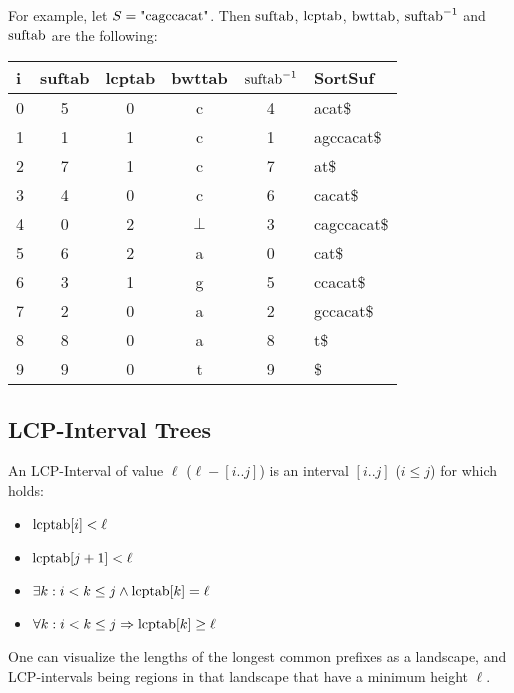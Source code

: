 \documentclass[a4paper,10pt]{article}
\begin{document}
For example, let $S=\hbox{"cagccacat"}$. Then $\hbox{suftab}$,
$\hbox{lcptab}$, $\hbox{bwttab}$, $\hbox{suftab}^{-1}$ and
$\hbox{suftab}$ are the following:


\begin{center}
	\begin{tabular}{ | l | c | c | c | c | l | }
		\hline
		i & suftab & lcptab & bwttab & $\hbox{suftab}^{-1}$ & SortSuf \\ \hline
		0 & 5 & 0 & c & 4 & acat\$ \\ \hline
		1 & 1 & 1 & c & 1 & agccacat\$ \\ \hline
		2 & 7 & 1 & c & 7 & at\$ \\ \hline
		3 & 4 & 0 & c & 6 & cacat\$ \\ \hline
		4 & 0 & 2 & $\bot$ & 3 & cagccacat\$ \\ \hline
		5 & 6 & 2 & a & 0 & cat\$ \\ \hline
		6 & 3 & 1 & g & 5 & ccacat\$ \\ \hline
		7 & 2 & 0 & a & 2 & gccacat\$ \\ \hline
		8 & 8 & 0 & a & 8 & t\$ \\ \hline
		9 & 9 & 0 & t & 9 & \$ \\ \hline
	\end{tabular}
\end{center}

\subsection*{LCP-Interval Trees}

An LCP-Interval of value $\ell$ ($\ell-[i..j]$) is an interval $[i..j]$ ($i \le j$)
for which holds:

\begin{itemize}
\item $\hbox{lcptab}[i]<\ell$
\item $\hbox{lcptab}[j+1]<\ell$
\item $\exists k: i<k\le j \land \hbox{lcptab}[k]=\ell$
\item $\forall k: i<k\le j \Rightarrow \hbox{lcptab}[k] \ge \ell$
\end{itemize}

One can visualize the lengths of the longest common prefixes as a
landscape, and LCP-intervals being regions in that landscape that have
a minimum height $\ell$.

\end{document}
